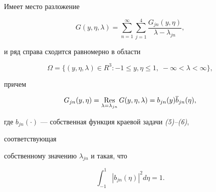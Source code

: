 \begin{lem} Имеет место разложение 


\begin{equation} 


G(y,\eta,\lambda)=\sum^\infty_{n=1} 


\sum^4_{j=1}\frac{G_{jn}(y,\eta)}{\lambda-\lambda_{jn}}, 


\end{equation} 


и ряд справа сходится равномерно в области 


$$ 


\Omega=\{(y,\eta,\lambda)\in R^3: -1\le y,\eta\le 1, \; 


-\infty<\lambda<\infty\}, 


$$ 


причем 


\begin{equation} 


G_{jn}(y,\eta)=\Res_{\lambda=\lambda_{jn}}G(y,\eta,\lambda)= 


b_{jn}(y)\overline b_{jn}(\eta), 


\end{equation} 


где $b_{jn}(\cdot)$ --- собственная функция краевой задачи {\em(5)--(6)}, 


соответствующая 


собственному значению $\lambda_{jn}$ и такая, что 


$$ 


\int^1_{-1}|b_{jn}(\eta)|^2d\eta=1. 


$$ 


\end{lem} 


 


